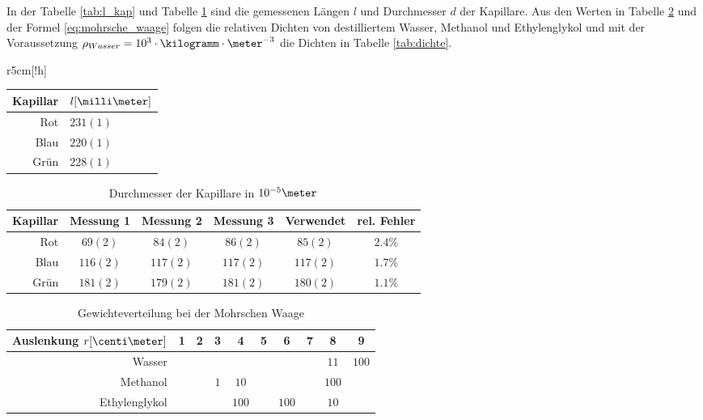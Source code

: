 \documentclass[12pt, a4paper, twoside]{scrartcl}
\begin{document}
In der Tabelle \ref{tab:l_kap} und Tabelle \ref{tab:d_kap} sind die gemessenen Längen $l$ und Durchmesser $d$ der Kapillare.
Aus den Werten in Tabelle \ref{tab:mohrsche_waage} und der Formel \eqref{eq:mohrsche_waage} folgen die relativen Dichten von destilliertem Wasser, Methanol und Ethylenglykol und mit der Voraussetzung $\rho _{Wasser} = 10^{3}\cdot\kilogramm\cdot\meter^{-3}$ die Dichten in Tabelle \ref{tab:dichte}.

\begin{wraptable}{r}{5cm}[!h]
\centering
\begin{tabular}{r|l}
    Kapillar & $l[\milli\meter]$\\
    \hline
    Rot & $231(1)$\\
    Blau & $220(1)$\\
    Grün & $228(1)$\\
    
 \end{tabular} 
 \caption{\label{tab:l_kap}Länge $l$ der Kapillare}
\end{wraptable}

\begin{table}[!h]
\centering
\begin{tabular}{r|c|c|c||c|c}
    Kapillar & Messung 1 & Messung 2 & Messung 3 & Verwendet & rel. Fehler\\
    \hline
    Rot & $69(2)$ & $84(2)$ & $86(2)$ & $85(2)$ & $ 2.4\%$\\
    Blau & $116(2)$ & $117(2)$ & $117(2)$ & $117(2)$ & $ 1.7\%$\\
    Grün & $181(2)$ & $179(2)$ & $181(2)$ & $180(2)$ & $ 1.1\%$\\
    
 \end{tabular} 
 \caption{\label{tab:d_kap} Durchmesser der Kapillare in $ 10^{-5} \meter$}
\end{table}

\begin{table}[!h]
\centering
\begin{tabular}{r|c|c|c|c|c|c|c|c|c}
    Auslenkung $r[\centi\meter]$ & 1 & 2 & 3 & 4 & 5 & 6 & 7 & 8 & 9\\
    \hline
    \hline
    Wasser & & & & & & & & $11$ & $100$ \\
    \hline
    Methanol & & & $1$ & $10$ & & & & $100$ & \\
    \hline
    Ethylenglykol & & & & $100$ & & $100$ & & $10$ & \\
    
 \end{tabular} 
 \caption{\label{tab:mohrsche_waage}Gewichteverteilung bei der Mohrschen Waage}
\end{table}
\end{document}
